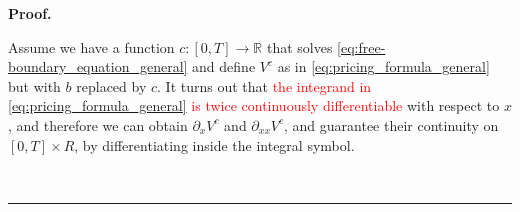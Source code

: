 \documentclass{tufte-handout}
\newcommand{\R}{\mathbb{R}} %
\newcommand{\red}[1]{\textcolor{red}{#1}}
\newenvironment{pf}[1][Proof]{\textbf{#1.} }{\ \rule{0.5em}{0.5em}}
\begin{document}
	\begin{pf}
		
		
		Assume we have a function $c:[0,T]\rightarrow \mathbb{R}$ that solves \eqref{eq:free-boundary_equation_general} and define $V^c$ as in \eqref{eq:pricing_formula_general} but with $b$ replaced by $c$. It turns out that \red{the integrand in \eqref{eq:pricing_formula_general} is twice continuously differentiable} with respect to $x$, and therefore we can obtain $\partial_x V^c$ and $\partial_{xx} V^c$, and guarantee their continuity on $[0, T]\times R$, by differentiating inside the integral symbol.
		
		

\end{pf}
\end{document}
